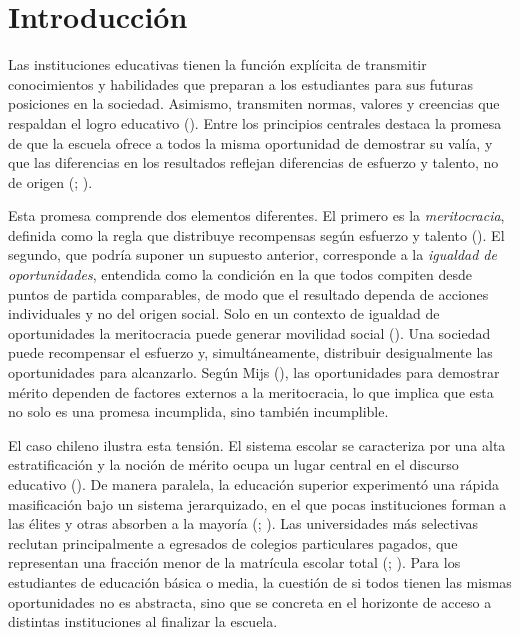 \documentclass[
  spanish,
  a4paper,
  oneside]{scrbook}
\begin{document}

\chapter{Introducción}\label{introducciuxf3n}

Las instituciones educativas tienen la función explícita de transmitir
conocimientos y habilidades que preparan a los estudiantes para sus
futuras posiciones en la sociedad. Asimismo, transmiten normas, valores
y creencias que respaldan el logro educativo
(). Entre los principios centrales
destaca la promesa de que la escuela ofrece a todos la misma oportunidad
de demostrar su valía, y que las diferencias en los resultados reflejan
diferencias de esfuerzo y talento, no de origen
(;
).

Esta promesa comprende dos elementos diferentes. El primero es la
\emph{meritocracia}, definida como la regla que distribuye recompensas
según esfuerzo y talento (). El
segundo, que podría suponer un supuesto anterior, corresponde a la
\emph{igualdad de oportunidades}, entendida como la condición en la que
todos compiten desde puntos de partida comparables, de modo que el
resultado dependa de acciones individuales y no del origen social. Solo
en un contexto de igualdad de oportunidades la meritocracia puede
generar movilidad social
(). Una
sociedad puede recompensar el esfuerzo y, simultáneamente, distribuir
desigualmente las oportunidades para alcanzarlo. Según Mijs
(), las oportunidades para demostrar
mérito dependen de factores externos a la meritocracia, lo que implica
que esta no solo es una promesa incumplida, sino también incumplible.

El caso chileno ilustra esta tensión. El sistema escolar se caracteriza
por una alta estratificación y la noción de mérito ocupa un lugar
central en el discurso educativo
(). De manera paralela, la educación superior experimentó una rápida
masificación bajo un sistema jerarquizado, en el que pocas instituciones
forman a las élites y otras absorben a la mayoría
(;
). Las
universidades más selectivas reclutan principalmente a egresados de
colegios particulares pagados, que representan una fracción menor de la
matrícula escolar total (; ). Para
los estudiantes de educación básica o media, la cuestión de si todos
tienen las mismas oportunidades no es abstracta, sino que se concreta en
el horizonte de acceso a distintas instituciones al finalizar la
escuela.
\end{document}
